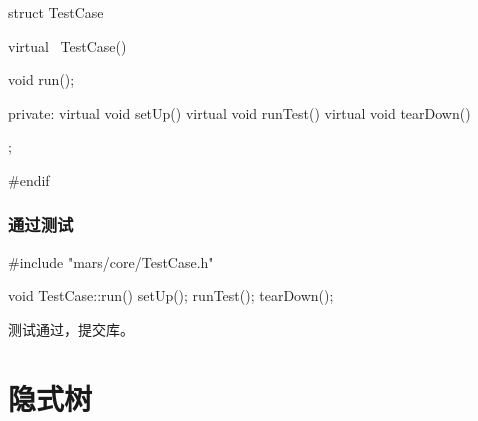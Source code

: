 \begin{content}
\begin{leftbar}
\begin{c++}[caption={\ttfamily{include/mars/core/TestCase.h}}]
struct TestCase {
  virtual ~TestCase() {}

  void run();

private:
  virtual void setUp() {}
  virtual void runTest() {}
  virtual void tearDown() {}
};

#endif
  \end{c++}
\end{leftbar}

\subsubsection{通过测试}

\begin{leftbar}
 \begin{c++}[caption={\ttfamily{src/mars/core/TestCase.cc}}]
#include "mars/core/TestCase.h"

void TestCase::run() {
  setUp();
  runTest();
  tearDown();
}
 \end{c++}
\end{leftbar}

测试通过，提交库。

\end{content}

\section{隐式树}

